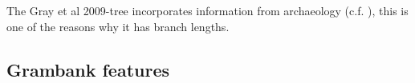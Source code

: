 \documentclass[a4paper,10pt]{article} %
\begin{document}
The Gray et al 2009-tree incorporates information from archaeology (c.f. \citet[92]{lynchrosscrowleyinternalsubgroupingoceanic}), this is one of the reasons why it has branch lengths.

\newpage
\subsection{Grambank features}
\label{Grambank_features}

\singlespacing
\begin{landscape}



\end{landscape}
\newpage






\newpage
\end{document}
